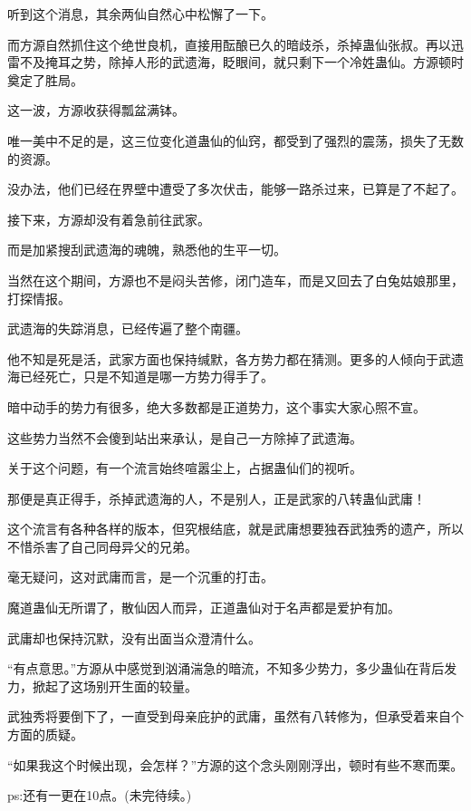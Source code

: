 \begin{this_body}
听到这个消息，其余两仙自然心中松懈了一下。

而方源自然抓住这个绝世良机，直接用酝酿已久的暗歧杀，杀掉蛊仙张叔。再以迅雷不及掩耳之势，除掉人形的武遗海，眨眼间，就只剩下一个冷姓蛊仙。方源顿时奠定了胜局。

这一波，方源收获得瓢盆满钵。

唯一美中不足的是，这三位变化道蛊仙的仙窍，都受到了强烈的震荡，损失了无数的资源。

没办法，他们已经在界壁中遭受了多次伏击，能够一路杀过来，已算是了不起了。

接下来，方源却没有着急前往武家。

而是加紧搜刮武遗海的魂魄，熟悉他的生平一切。

当然在这个期间，方源也不是闷头苦修，闭门造车，而是又回去了白兔姑娘那里，打探情报。

武遗海的失踪消息，已经传遍了整个南疆。

他不知是死是活，武家方面也保持缄默，各方势力都在猜测。更多的人倾向于武遗海已经死亡，只是不知道是哪一方势力得手了。

暗中动手的势力有很多，绝大多数都是正道势力，这个事实大家心照不宣。

这些势力当然不会傻到站出来承认，是自己一方除掉了武遗海。

关于这个问题，有一个流言始终喧嚣尘上，占据蛊仙们的视听。

那便是真正得手，杀掉武遗海的人，不是别人，正是武家的八转蛊仙武庸！

这个流言有各种各样的版本，但究根结底，就是武庸想要独吞武独秀的遗产，所以不惜杀害了自己同母异父的兄弟。

毫无疑问，这对武庸而言，是一个沉重的打击。

魔道蛊仙无所谓了，散仙因人而异，正道蛊仙对于名声都是爱护有加。

武庸却也保持沉默，没有出面当众澄清什么。

“有点意思。”方源从中感觉到汹涌湍急的暗流，不知多少势力，多少蛊仙在背后发力，掀起了这场别开生面的较量。

武独秀将要倒下了，一直受到母亲庇护的武庸，虽然有八转修为，但承受着来自个方面的质疑。

“如果我这个时候出现，会怎样？”方源的这个念头刚刚浮出，顿时有些不寒而栗。

ps:还有一更在10点。(未完待续。)

\end{this_body}

